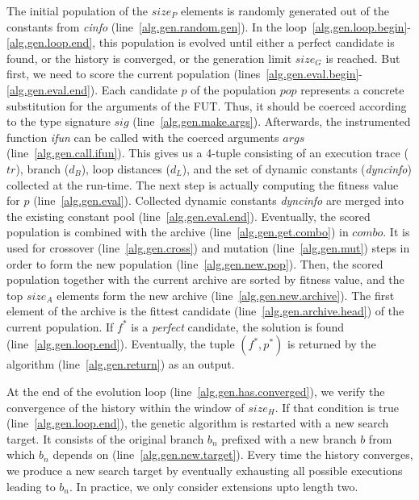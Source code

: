 The initial population of the $size_P$ elements is randomly generated out of the constants from \emph{cinfo} (line~\ref{alg.gen.random.gen}). In the loop~\ref{alg.gen.loop.begin}-\ref{alg.gen.loop.end}, this population is evolved until either a perfect candidate is found, or the history is converged, or the generation limit $size_G$ is reached. But first, we need to score the current population (lines~\ref{alg.gen.eval.begin}-\ref{alg.gen.eval.end}). Each candidate $p$ of the population $pop$ represents a concrete substitution for the arguments of the FUT. Thus, it should be coerced according to the type signature $sig$ (line~\ref{alg.gen.make.args}). Afterwards, the instrumented function \emph{ifun} can be called with the coerced arguments $args$ (line~\ref{alg.gen.call.ifun}). This gives us a 4-tuple consisting of an execution trace ($tr$), branch ($d_B$), loop distances ($d_L$), and the set of dynamic constants (\emph{dyncinfo}) collected at the run-time. The next step is actually computing the fitness value for $p$ (line~\ref{alg.gen.eval}). Collected dynamic constants \emph{dyncinfo} are merged into the existing constant pool (line~\ref{alg.gen.eval.end}). Eventually, the scored population is combined with the archive (line~\ref{alg.gen.get.combo}) in $combo$. It is used for crossover (line~\ref{alg.gen.cross}) and mutation (line~\ref{alg.gen.mut}) steps in order to form the new population (line~\ref{alg.gen.new.pop}). Then, the scored population together with the current archive are sorted by fitness value, and the top $size_A$ elements form the new archive (line~\ref{alg.gen.new.archive}). The first element of the archive is the fittest candidate (line~\ref{alg.gen.archive.head}) of the current population. If $f^*$ is a \emph{perfect} candidate, the solution is found (line~\ref{alg.gen.loop.end}). Eventually, the tuple $(f^*, p^*)$ is returned by the algorithm (line~\ref{alg.gen.return}) as an output.

At the end of the evolution loop (line~\ref{alg.gen.has.converged}), we verify the convergence of the history within the window of $size_H$. If that condition is true (line~\ref{alg.gen.loop.end}), the genetic algorithm is restarted with a new search target. It consists of the original branch $b_n$ prefixed with a new branch $b$ from which $b_n$ depends on (line~\ref{alg.gen.new.target}). Every time the history converges, we produce a new search target by eventually exhausting all possible executions leading to $b_n$. In practice, we only consider extensions upto length two.

